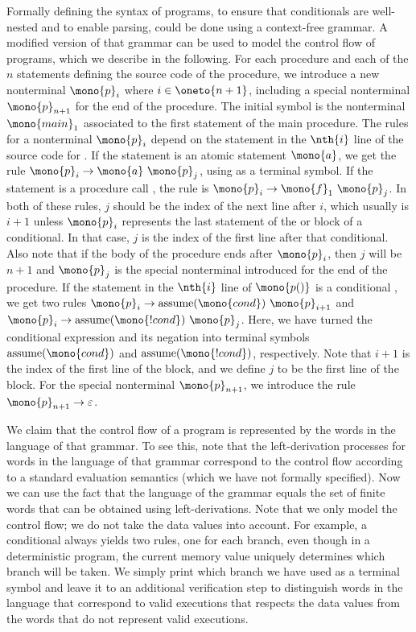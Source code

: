 \documentclass[../../diss.tex]{subfiles}
\begin{document}
Formally defining the syntax of programs, \eg to ensure that conditionals are well-nested and to enable parsing, could be done using a context-free grammar.
A modified version of that grammar can be used to model the control flow of programs, which we describe in the following.
For each procedure  and each of the $n$ statements defining the source code of the procedure, we introduce a new nonterminal $\mono{p}_i$ where $i \in \oneto{n+1}$, including a special nonterminal $\mono{p}_{n+1}$ for the end of the procedure.
The initial symbol is the nonterminal $\mono{main}_1$ associated to the first statement of the main procedure.
The rules for a nonterminal $\mono{p}_{i}$ depend on the statement in the $\nth{i}$ line of the source code for .
If the statement is an atomic statement $\mono{a}$, we get the rule $\mono{p}_i \to \mono{a} \ \mono{p}_j$, using  as a terminal symbol.
If the statement is a procedure call , the rule is $\mono{p}_i \to \mono{f}_1 \ \mono{p}_j$.
In both of these rules, $j$ should be the index of the next line after $i$, which usually is $i+1$ unless $\mono{p}_i$ represents the last statement of the  or  block of a conditional.
In that case, $j$ is the index of the first line after that conditional.
Also note that if the body of the procedure ends after $\mono{p}_i$, then $j$ will be $n+1$ and $\mono{p}_j$ is the special nonterminal introduced for the end of the procedure.
If the statement in the $\nth{i}$ line of $\mono{p()}$ is a conditional , we get two rules $\mono{p}_i \to \text{assume}(\mono{cond}) \ \mono{p}_{i+1}$ and $\mono{p}_i \to \text{assume}(\mono{!cond}) \ \mono{p}_j$.
Here, we have turned the conditional expression and its negation into terminal symbols $\text{assume}(\mono{cond})$ and $\text{assume}(\mono{!cond})$, respectively.
Note that $i+1$ is the index of the first line of the  block, and we define $j$ to be the first line of the  block.
For the special nonterminal $\mono{p}_{n+1}$, we introduce the rule $\mono{p}_{n+1} \to \eps$.

We claim that the control flow of a program is represented by the words in the language of that grammar.
To see this, note that the left-derivation processes for words in the language of that grammar correspond to the control flow according to a standard evaluation semantics (which we have not formally specified).
Now we can use the fact that the language of the grammar equals the set of finite words that can be obtained using left-derivations.
Note that we only model the control flow; we do not take the data values into account.
For example, a conditional always yields two rules, one for each branch, even though in a deterministic program, the current memory value uniquely determines which branch will be taken.
We simply print which branch we have used as a terminal symbol and leave it to an additional verification step to distinguish words in the language that correspond to valid executions that respects the data values from the words that do not represent valid executions.
\end{document}
